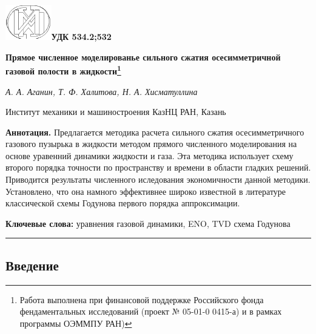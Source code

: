 \documentclass{article}
\begin{document}
\thispagestyle{empty}
\includegraphics[width=2cm]{label}\hfill\textbf{УДК 534.2;532}\newline\newline
\begin{center}

\fontsize{17}{10}\selectfont\textbf{Прямое численное моделированье сильного сжатия осесимметричной газовой полости в жидкости\footnote{Работа выполнена при финансовой поддержке Российского фонда фендаментальных исследований (проект № 05-01-0 0415-а) и в рамках программы ОЭММПУ РАН)}}\newline
\end{center}
\begin{center}
\fontsize{12}{10}\textit{А. А. Аганин, Т. Ф. Халитова, Н. А. Хисматуллина}
\end{center}
\begin{center}
Институт механики и машиностроения КазНЦ РАН, Казань\newline
\end{center}
\textbf{Аннотация.} 
Предлагается методика расчета сильного сжатия осесимметричного газового пузырька в жидкости методом прямого численного моделирования на основе уравенний динамики жидкости и газа. Эта методика использует схему второго порядка точности по пространству и времени в области гладких решений. Приводится результаты численного иследования экономичности данной методики. Установлено, что она намного эффективнее широко известной в литературе классической схемы Годунова первого порядка аппроксимации.
\begin{flushleft}
\textbf{Ключевые слова:}
\textsf{уравнения газовой динамики, ENO, TVD схема Годунова}
\end{flushleft}
\begin{center}
\rule{4.5cm}{0.4pt}
\end{center}
\begin{flushleft}
\section{Введение}
\end{flushleft}
\end{document}
